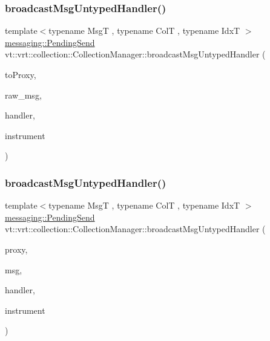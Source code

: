 \subsubsection{\texorpdfstring{broadcast\+Msg\+Untyped\+Handler()}{broadcastMsgUntypedHandler()}\hspace{0.1cm}{\footnotesize\ttfamily [1/2]}}
{\footnotesize\ttfamily template$<$typename MsgT , typename ColT , typename IdxT $>$ \\
\hyperlink{structvt_1_1messaging_1_1_pending_send}{messaging\+::\+Pending\+Send} vt\+::vrt\+::collection\+::\+Collection\+Manager\+::broadcast\+Msg\+Untyped\+Handler (\begin{DoxyParamCaption}\item[{\hyperlink{structvt_1_1vrt_1_1collection_1_1_collection_manager_a56458ed7f9bb22b631b9b3a745f42f94}{Collection\+Proxy\+Wrap\+Type}$<$ ColT, IdxT $>$ const \&}]{to\+Proxy,  }\item[{MsgT $\ast$}]{raw\+\_\+msg,  }\item[{\hyperlink{namespacevt_af64846b57dfcaf104da3ef6967917573}{Handler\+Type} const}]{handler,  }\item[{\mbox{[}\mbox{[}maybe\+\_\+unused\mbox{]} \mbox{]} bool}]{instrument }\end{DoxyParamCaption})}

\mbox{\label{structvt_1_1vrt_1_1collection_1_1_collection_manager_a3a0ce58242fe4a9f18ca105ba9d9e8ea}} 
\subsubsection{\texorpdfstring{broadcast\+Msg\+Untyped\+Handler()}{broadcastMsgUntypedHandler()}\hspace{0.1cm}{\footnotesize\ttfamily [2/2]}}
{\footnotesize\ttfamily template$<$typename MsgT , typename ColT , typename IdxT $>$ \\
\hyperlink{structvt_1_1messaging_1_1_pending_send}{messaging\+::\+Pending\+Send} vt\+::vrt\+::collection\+::\+Collection\+Manager\+::broadcast\+Msg\+Untyped\+Handler (\begin{DoxyParamCaption}\item[{\hyperlink{structvt_1_1vrt_1_1collection_1_1_collection_manager_a56458ed7f9bb22b631b9b3a745f42f94}{Collection\+Proxy\+Wrap\+Type}$<$ ColT, IdxT $>$ const \&}]{proxy,  }\item[{MsgT $\ast$}]{msg,  }\item[{\hyperlink{namespacevt_af64846b57dfcaf104da3ef6967917573}{Handler\+Type} const}]{handler,  }\item[{bool}]{instrument }\end{DoxyParamCaption})}



